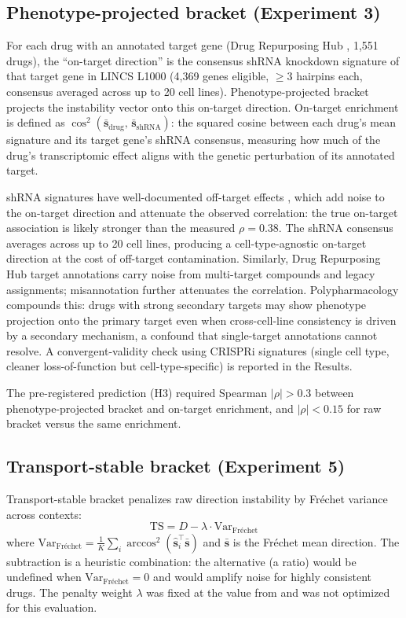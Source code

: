 \documentclass[11pt]{article}
\begin{document}
\subsection{Phenotype-projected bracket (Experiment 3)}

For each drug with an annotated target gene (Drug Repurposing Hub
\citep{corsello2017drug}, 1{,}551 drugs), the ``on-target direction'' is the consensus shRNA
knockdown signature of that target gene in LINCS L1000 (4{,}369 genes
eligible, $\geq$3 hairpins each, consensus averaged across up to 20 cell lines).
Phenotype-projected bracket projects the instability vector onto this
on-target direction. On-target enrichment is defined as $\cos^2(\bar{\mathbf{s}}_{\text{drug}},\,
\bar{\mathbf{s}}_{\text{shRNA}})$: the squared cosine between each drug's
mean signature and its target gene's shRNA consensus, measuring how much
of the drug's transcriptomic effect aligns with the genetic perturbation of
its annotated target.

shRNA signatures have well-documented off-target effects
\citep{smith2017evaluation}, which add noise to the on-target direction
and attenuate the observed correlation: the true on-target association is
likely stronger than the measured $\rho = 0.38$.
The shRNA consensus averages across up to 20 cell lines, producing a
cell-type-agnostic on-target direction at the cost of off-target
contamination. Similarly, Drug Repurposing Hub target annotations carry
noise from multi-target compounds and legacy assignments; misannotation
further attenuates the correlation. Polypharmacology compounds this:
drugs with strong secondary targets may show phenotype projection onto the
primary target even when cross-cell-line consistency is driven by a
secondary mechanism, a confound that single-target annotations cannot
resolve. A convergent-validity
check using CRISPRi signatures (single cell type, cleaner
loss-of-function but cell-type-specific) is reported in the Results.

The pre-registered prediction (H3) required Spearman $|\rho| > 0.3$ between
phenotype-projected bracket and on-target enrichment, and $|\rho| < 0.15$
for raw bracket versus the same enrichment.

\subsection{Transport-stable bracket (Experiment 5)}

Transport-stable bracket penalizes raw direction instability by Fr\'{e}chet
variance across contexts:
\begin{equation}
  \text{TS} = D - \lambda \cdot \text{Var}_{\text{Fr\'echet}}
  \label{eq:ts}
\end{equation}
where $\text{Var}_{\text{Fr\'echet}} = \frac{1}{K}\sum_i
\arccos^2(\hat{\mathbf{s}}_i^\top \bar{\mathbf{s}})$ and
$\bar{\mathbf{s}}$ is the Fr\'echet mean direction. The subtraction is a
heuristic combination: the alternative (a ratio) would be undefined when
$\text{Var}_{\text{Fr\'echet}} = 0$ and would amplify noise for highly
consistent drugs. The penalty weight $\lambda$ was fixed at the value from
\citet{tower2026drug} and was not optimized for this evaluation.
\end{document}
